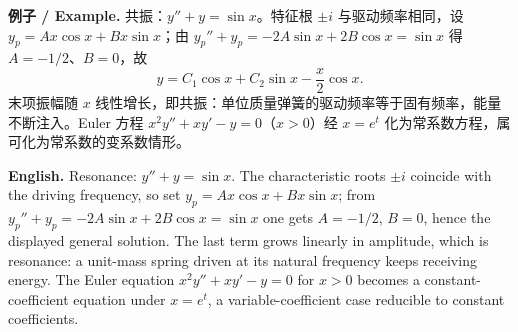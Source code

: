 \documentclass[UTF8,11pt,a4paper]{ctexart}
\newcommand{\EN}[1]{\par\noindent \textbf{English.} #1\par}
\newcommand{\EX}[2]{\par\noindent \textbf{例子 / Example.} #1\par\EN{#2}}
\begin{document}
\EX{共振：$y''+y=\sin x$。特征根 $\pm i$ 与驱动频率相同，设 $y_p=Ax\cos x+Bx\sin x$；由 $y_p''+y_p=-2A\sin x+2B\cos x=\sin x$ 得 $A=-1/2$、$B=0$，故
\[
y=C_1\cos x+C_2\sin x-\frac{x}{2}\cos x .
\]
末项振幅随 $x$ 线性增长，即共振：单位质量弹簧的驱动频率等于固有频率，能量不断注入。Euler 方程 $x^2y''+xy'-y=0$（$x>0$）经 $x=e^t$ 化为常系数方程，属可化为常系数的变系数情形。}{Resonance: $y''+y=\sin x$. The characteristic roots $\pm i$ coincide with the driving frequency, so set $y_p=Ax\cos x+Bx\sin x$; from $y_p''+y_p=-2A\sin x+2B\cos x=\sin x$ one gets $A=-1/2$, $B=0$, hence the displayed general solution. The last term grows linearly in amplitude, which is resonance: a unit-mass spring driven at its natural frequency keeps receiving energy. The Euler equation $x^2y''+xy'-y=0$ for $x>0$ becomes a constant-coefficient equation under $x=e^t$, a variable-coefficient case reducible to constant coefficients.}
\end{document}
